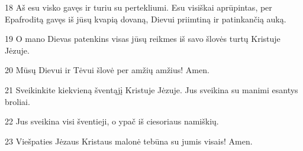 \par 18 Aš esu visko gavęs ir turiu su pertekliumi. Esu visiškai aprūpintas, per Epafroditą gavęs iš jūsų kvapią dovaną, Dievui priimtiną ir patinkančią auką. 
\par 19 O mano Dievas patenkins visas jūsų reikmes iš savo šlovės turtų Kristuje Jėzuje. 
\par 20 Mūsų Dievui ir Tėvui šlovė per amžių amžius! Amen. 
\par 21 Sveikinkite kiekvieną šventąjį Kristuje Jėzuje. Jus sveikina su manimi esantys broliai. 
\par 22 Jus sveikina visi šventieji, o ypač iš ciesoriaus namiškių. 
\par 23 Viešpaties Jėzaus Kristaus malonė tebūna su jumis visais! Amen.



